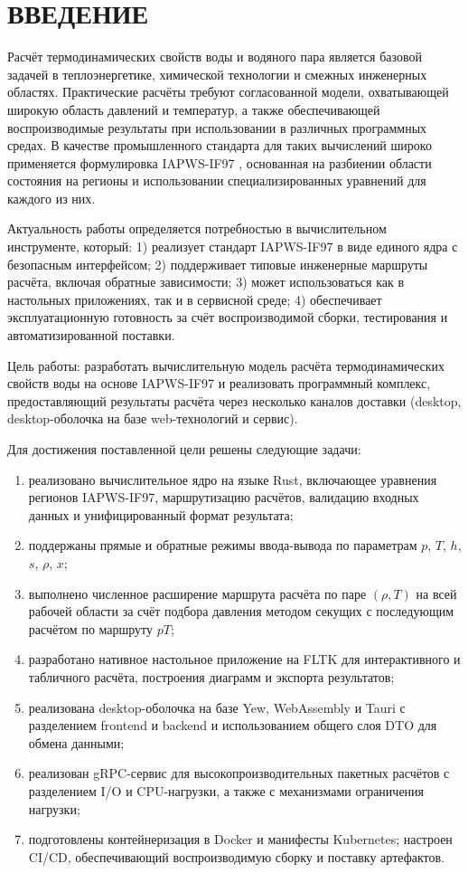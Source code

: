 \clearpage
\chapter*{ВВЕДЕНИЕ}

Расчёт термодинамических свойств воды и водяного пара является базовой задачей в теплоэнергетике, химической технологии и смежных инженерных областях.
Практические расчёты требуют согласованной модели, охватывающей широкую область давлений и температур, а также обеспечивающей воспроизводимые результаты при использовании в различных программных средах.
В качестве промышленного стандарта для таких вычислений широко применяется формулировка IAPWS-IF97 \cite{iapws_if97_2012}, основанная на разбиении области состояния на регионы и использовании специализированных уравнений для каждого из них.

Актуальность работы определяется потребностью в вычислительном инструменте, который:
1) реализует стандарт IAPWS-IF97 в виде единого ядра с безопасным интерфейсом;
2) поддерживает типовые инженерные маршруты расчёта, включая обратные зависимости;
3) может использоваться как в настольных приложениях, так и в сервисной среде;
4) обеспечивает эксплуатационную готовность за счёт воспроизводимой сборки,
тестирования и автоматизированной поставки.

Цель работы: разработать вычислительную модель расчёта термодинамических свойств воды на основе IAPWS-IF97 и реализовать программный комплекс, предоставляющий результаты расчёта через несколько каналов доставки (desktop, desktop-оболочка на базе web-технологий и сервис).

Для достижения поставленной цели решены следующие задачи:
\begin{enumerate}
\item реализовано вычислительное ядро на языке Rust, включающее уравнения регионов IAPWS-IF97, маршрутизацию расчётов, валидацию входных данных и унифицированный формат результата;
\item поддержаны прямые и обратные режимы ввода-вывода по параметрам $p$, $T$, $h$, $s$, $\rho$, $x$;
\item выполнено численное расширение маршрута расчёта по паре $(\rho, T)$ на всей рабочей области за счёт подбора давления методом секущих с последующим расчётом по маршруту $pT$;
\item разработано нативное настольное приложение на FLTK для интерактивного и табличного расчёта, построения диаграмм и экспорта результатов;
\item реализована desktop-оболочка на базе Yew, WebAssembly и Tauri с разделением frontend и backend и использованием общего слоя DTO для обмена данными;
\item реализован gRPC-сервис для высокопроизводительных пакетных расчётов с разделением I/O и CPU-нагрузки, а также с механизмами ограничения нагрузки;
\item подготовлены контейнеризация в Docker и манифесты Kubernetes; настроен CI/CD, обеспечивающий воспроизводимую сборку и поставку артефактов.
\end{enumerate}

